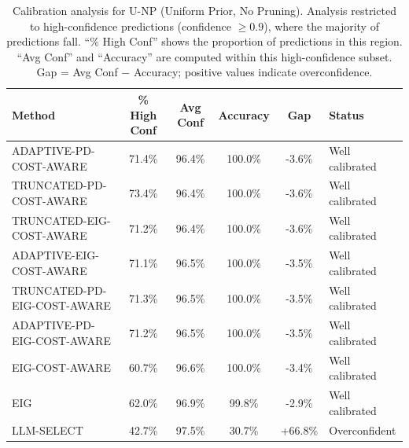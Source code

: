 \begin{table}[htbp]
\centering
\small
\caption{Calibration analysis for U-NP (Uniform Prior, No Pruning). Analysis restricted to high-confidence predictions (confidence $\geq 0.9$), where the majority of predictions fall. ``\% High Conf'' shows the proportion of predictions in this region. ``Avg Conf'' and ``Accuracy'' are computed within this high-confidence subset. Gap = Avg Conf $-$ Accuracy; positive values indicate overconfidence.}
\label{tab:calibration-notprune_uniform}
\begin{tabular}{@{}lccccl@{}}
\toprule
Method & \% High Conf & Avg Conf & Accuracy & Gap & Status \\
\midrule
ADAPTIVE-PD-COST-AWARE & 71.4\% & 96.4\% & 100.0\% & -3.6\% & Well calibrated \\
TRUNCATED-PD-COST-AWARE & 73.4\% & 96.4\% & 100.0\% & -3.6\% & Well calibrated \\
TRUNCATED-EIG-COST-AWARE & 71.2\% & 96.4\% & 100.0\% & -3.6\% & Well calibrated \\
ADAPTIVE-EIG-COST-AWARE & 71.1\% & 96.5\% & 100.0\% & -3.5\% & Well calibrated \\
TRUNCATED-PD-EIG-COST-AWARE & 71.3\% & 96.5\% & 100.0\% & -3.5\% & Well calibrated \\
ADAPTIVE-PD-EIG-COST-AWARE & 71.2\% & 96.5\% & 100.0\% & -3.5\% & Well calibrated \\
EIG-COST-AWARE & 60.7\% & 96.6\% & 100.0\% & -3.4\% & Well calibrated \\
EIG & 62.0\% & 96.9\% & 99.8\% & -2.9\% & Well calibrated \\
LLM-SELECT & 42.7\% & 97.5\% & 30.7\% & +66.8\% & Overconfident \\
\bottomrule
\end{tabular}
\end{table}